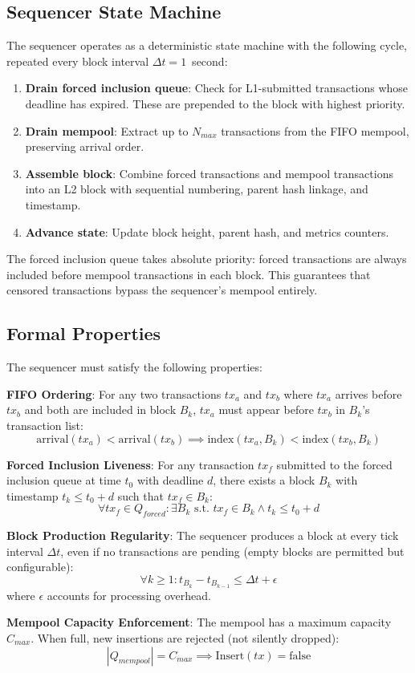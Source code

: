 \subsection{Sequencer State Machine}

The sequencer operates as a deterministic state machine with the following cycle,
repeated every block interval $\Delta t = 1$~second:

\begin{enumerate}
  \item \textbf{Drain forced inclusion queue}: Check for L1-submitted transactions
    whose deadline has expired. These are prepended to the block with highest priority.
  \item \textbf{Drain mempool}: Extract up to $N_{max}$ transactions from the FIFO
    mempool, preserving arrival order.
  \item \textbf{Assemble block}: Combine forced transactions and mempool transactions
    into an L2 block with sequential numbering, parent hash linkage, and timestamp.
  \item \textbf{Advance state}: Update block height, parent hash, and metrics counters.
\end{enumerate}

The forced inclusion queue takes absolute priority: forced transactions are always
included before mempool transactions in each block. This guarantees that censored
transactions bypass the sequencer's mempool entirely.

\subsection{Formal Properties}

The sequencer must satisfy the following properties:

\textbf{FIFO Ordering}: For any two transactions $tx_a$ and $tx_b$ where $tx_a$
arrives before $tx_b$ and both are included in block $B_k$, $tx_a$ must appear
before $tx_b$ in $B_k$'s transaction list:
\[
  \text{arrival}(tx_a) < \text{arrival}(tx_b) \implies \text{index}(tx_a, B_k) < \text{index}(tx_b, B_k)
\]

\textbf{Forced Inclusion Liveness}: For any transaction $tx_f$ submitted to the
forced inclusion queue at time $t_0$ with deadline $d$, there exists a block $B_k$
with timestamp $t_k \leq t_0 + d$ such that $tx_f \in B_k$:
\[
  \forall tx_f \in Q_{forced}: \exists B_k \text{ s.t. } tx_f \in B_k \land t_k \leq t_0 + d
\]

\textbf{Block Production Regularity}: The sequencer produces a block at every tick
interval $\Delta t$, even if no transactions are pending (empty blocks are permitted
but configurable):
\[
  \forall k \geq 1: t_{B_k} - t_{B_{k-1}} \leq \Delta t + \epsilon
\]
where $\epsilon$ accounts for processing overhead.

\textbf{Mempool Capacity Enforcement}: The mempool has a maximum capacity $C_{max}$.
When full, new insertions are rejected (not silently dropped):
\[
  |Q_{mempool}| = C_{max} \implies \text{Insert}(tx) = \text{false}
\]
